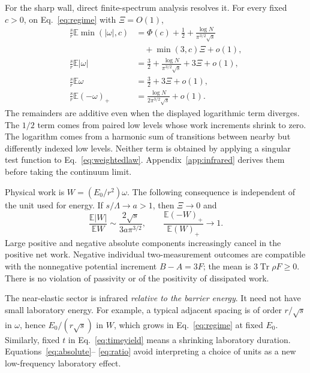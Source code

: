 \documentclass[aps,pra,reprint,superscriptaddress,longbibliography]{revtex4-2}
\newcommand{\Tr}{\operatorname{Tr}}
\begin{document}
For the sharp wall, direct finite-spectrum analysis resolves it.
For every fixed $c>0$, on Eq.~\eqref{eq:regime} with $\Xi=O(1)$,
\begin{align}
 \frac s r\mathbb E\min(|\omega|,c)
 &=\Phi(c)+\frac12+\frac{\log N}{\pi^{3/2}\sqrt s}
                   \nonumber\\
 &\quad+\min(3,c)\Xi+o(1),\label{eq:abscap}\\
 \frac s r\mathbb E|\omega|
 &=\frac32+\frac{\log N}{\pi^{3/2}\sqrt s}+3\Xi+o(1),
                                                            \label{eq:absolute}\\
 \frac s r\mathbb E\omega&=\frac32+3\Xi+o(1),\qquad\nonumber\\
 \frac s r\mathbb E(-\omega)_+
       &=\frac{\log N}{2\pi^{3/2}\sqrt s}+o(1).                \label{eq:negative}
\end{align}
The remainders are additive even when the displayed logarithmic term
diverges. The $1/2$ term comes from paired low levels whose work
increments shrink to zero. The logarithm comes from a harmonic sum
of transitions between nearby but differently indexed low levels.
Neither term is obtained by applying a singular test function to
Eq.~\eqref{eq:weightedlaw}. Appendix~\ref{app:infrared} derives them
before taking the continuum limit.

Physical work is $W=(E_0/r^2)\omega$. The following consequence is
independent of the unit used for energy. If
$s/\Lambda\to a>1$, then $\Xi\to0$ and
\begin{equation}
 \frac{\mathbb E|W|}{\mathbb EW}
       \sim\frac{2\sqrt{s}}{3a\pi^{3/2}},\qquad
 \frac{\mathbb E(-W)_+}{\mathbb E(W)_+}\longrightarrow1.       \label{eq:ratio}
\end{equation}
Large positive and negative absolute components increasingly cancel
in the positive net work. Negative individual two-measurement outcomes
are compatible with the nonnegative potential increment $B-A=3F$;
the mean is $3\Tr\rho F\ge0$. There is no violation of passivity or
of the positivity of dissipated work.

The near-elastic sector is infrared \emph{relative to the barrier
energy}. It need not have small laboratory energy. For example, a
typical adjacent spacing is of order $r/\sqrt s$ in $\omega$, hence
$E_0/(r\sqrt s)$ in $W$, which grows in Eq.~\eqref{eq:regime} at
fixed $E_0$. Similarly, fixed $t$ in Eq.~\eqref{eq:timeyield} means a
shrinking laboratory duration. Equations~\eqref{eq:absolute}--
\eqref{eq:ratio} avoid interpreting a choice of units as a new
low-frequency laboratory effect.
\end{document}
